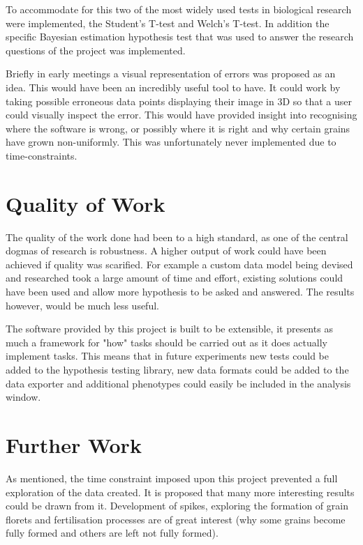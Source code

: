 \documentclass[11pt]{report}
\begin{document}
To accommodate for this two of the most widely used tests in biological research were implemented, the Student's T-test and Welch's T-test. In addition the specific Bayesian estimation hypothesis test that was used to answer the research questions of the project was implemented.

Briefly in early meetings a visual representation of errors was proposed as an idea. This would have been an incredibly useful tool to have. It could work by taking possible erroneous data points displaying their image in 3D so that a user could visually inspect the error. This would have provided insight into recognising where the software is wrong, or possibly where it is right and why certain grains have grown non-uniformly. This was unfortunately never implemented due to time-constraints.


\section{Quality of Work}
\label{sec:org91e0ee6}
The quality of the work done had been to a high standard, as one of the central dogmas of research is robustness. A higher output of work could have been achieved if quality was scarified. For example a custom data model being devised and researched took a large amount of time and effort, existing solutions could have been used and allow more hypothesis to be asked and answered. The results however, would be much less useful.

The software provided by this project is built to be extensible, it presents as much a framework for "how" tasks should be carried out as it does actually implement tasks. This means that in future experiments new tests could be added to the hypothesis testing library, new data formats could be added to the data exporter and additional phenotypes could easily be included in the analysis window.

\section{Further Work}
\label{sec:org72ab7ce}

As mentioned, the time constraint imposed upon this project prevented a full exploration of the data created. It is proposed that many more interesting results could be drawn from it. Development of spikes, exploring the formation of grain florets and fertilisation processes are of great interest (why some grains become fully formed and others are left not fully formed).
\end{document}
